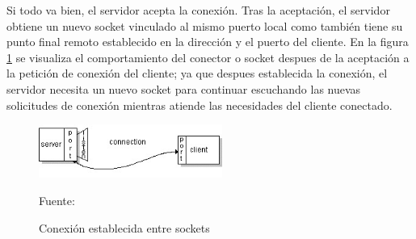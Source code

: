 Si todo va bien, el servidor acepta la conexión. Tras la aceptación, el servidor obtiene un nuevo socket vinculado al mismo puerto local como también tiene su punto final remoto establecido en la dirección y el puerto del cliente. En la figura \ref{fig:socket_connection} se visualiza el comportamiento del conector o socket despues de la aceptación a la petición de conexión del cliente; ya que despues establecida la conexión, el servidor necesita un nuevo socket para continuar escuchando las nuevas solicitudes de conexión mientras atiende las necesidades del cliente conectado.\\

\begin{figure}[H]
    \begin{center}
        \includegraphics[width=6cm]{img/capitulo_2/socket_connection.jpg}
        \caption{Conexión establecida entre sockets\\}
        Fuente: \cite{socketconnection}
        \label{fig:socket_connection}
    \end{center}
    
\end{figure}




